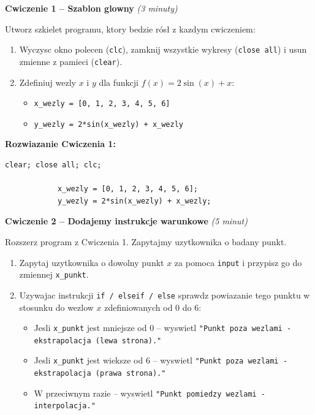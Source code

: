 \documentclass[12pt,a4paper]{article}
\begin{document}
	\begin{cwiczeniebox}
		\textbf{Cwiczenie 1 -- Szablon glowny} \quad \textit{(3 minuty)}
		
		Utworz szkielet programu, ktory bedzie rósł z kazdym cwiczeniem:
		
		\begin{enumerate}[leftmargin=*,itemsep=2pt]
			\item Wyczysc okno polecen (\texttt{clc}), zamknij wszystkie wykresy (\texttt{close all}) i usun zmienne z pamieci (\texttt{clear}).
			\item Zdefiniuj wezly $x$ i $y$ dla funkcji $f(x) = 2\sin(x) + x$:
			\begin{itemize}
				\item \texttt{x\_wezly = [0, 1, 2, 3, 4, 5, 6]}
				\item \texttt{y\_wezly = 2*sin(x\_wezly) + x\_wezly}
			\end{itemize}
		\end{enumerate}
	\end{cwiczeniebox}
	
	\newpage
	\begin{rozwiazaniebox}
		\textbf{Rozwiazanie Cwiczenia 1:}
		\begin{lstlisting}[caption={Cwiczenie 1 - Szablon glowny}]
			clear; close all; clc;
			
			x_wezly = [0, 1, 2, 3, 4, 5, 6];
			y_wezly = 2*sin(x_wezly) + x_wezly;
		\end{lstlisting}
	\end{rozwiazaniebox}
	
	\newpage
	\begin{cwiczeniebox}
		\textbf{Cwiczenie 2 -- Dodajemy instrukcje warunkowe} \quad \textit{(5 minut)}
		
		Rozszerz program z Cwiczenia 1. Zapytajmy uzytkownika o badany punkt.
		
		\begin{enumerate}[leftmargin=*,itemsep=2pt]
			\item Zapytaj uzytkownika o dowolny punkt $x$ za pomoca \texttt{input} i przypisz go do zmiennej \texttt{x\_punkt}.
			\item Uzywajac instrukcji \texttt{if / elseif / else} sprawdz powiazanie tego punktu w stosunku do wezlow $x$ zdefiniowanych od 0 do 6:
			\begin{itemize}
				\item Jesli \texttt{x\_punkt} jest mniejsze od 0 – wyswietl \texttt{"Punkt poza wezlami - ekstrapolacja (lewa strona)."}
				\item Jesli \texttt{x\_punkt} jest wieksze od 6 – wyswietl \texttt{"Punkt poza wezlami - ekstrapolacja (prawa strona)."}
				\item W przeciwnym razie – wyswietl \texttt{"Punkt pomiedzy wezlami - interpolacja."}
			\end{itemize}
		\end{enumerate}
	\end{cwiczeniebox}
	
\end{document}
